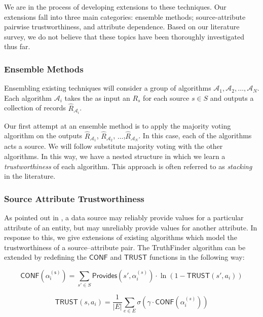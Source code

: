 \documentclass{acm_proc_article-sp}
\begin{document}
We are in the process of developing extensions to these techniques. Our extensions fall into three main categories: ensemble methods; source-attribute pairwise trustworthiness, and attribute dependence. Based on our literature survey, we do not believe that these topics have been thoroughly investigated thus far. 


\subsubsection{Ensemble Methods}

Ensembling existing techniques will consider a group of algorithms $\mathcal{A}_1,\mathcal{A}_2,\dots,\mathcal{A}_N$. Each algorithm $\mathcal{A}_i$ takes the as input an $R_s$ for each source $s \in S$ and outputs a collection of records $\hat{R}_{\mathcal{A}_i}$. 

Our first attempt at an ensemble method is to apply the majority voting algorithm on the outputs $\hat{R}_{\mathcal{A}_1}$, $\hat{R}_{\mathcal{A}_2}$, $\dots$,$\hat{R}_{\mathcal{A}_N}$. In this case, each of the algorithms acts a source. We will follow substitute majority voting with the other algorithms. In this way, we have a nested structure in which we learn a \emph{trustworthiness} of each algorithm. This approach is often referred to as \emph{stacking} in the literature. 

\subsubsection{Source Attribute Trustworthiness}

As pointed out in \cite{dong:truth}, a data source may reliably provide values for a particular attribute of an entity, but may unreliably provide values for another attribute. In response to this, we give extensions of existing algorithms which model the trustworthiness of a source--attribute pair.  The {\sc TruthFinder} algorithm can be extended by redefining the $\mathsf{CONF}$ and $\mathsf{TRUST}$ functions in the following way: 


\begin{equation}
\mathsf{CONF(\alpha_i^{(s)})} = \sum_{s' \in S} \mathsf{Provides}(s',\alpha_i^{(s)}) \cdot \ln(1-\mathsf{TRUST}(s',a_i))
\end{equation}


\begin{equation}
\mathsf{TRUST}(s,a_i) = \frac{1}{|E|} \sum_{e \in E} \sigma(\gamma \cdot \mathsf{CONF}(\alpha_i^{(s)}))
\end{equation}
\end{document}
